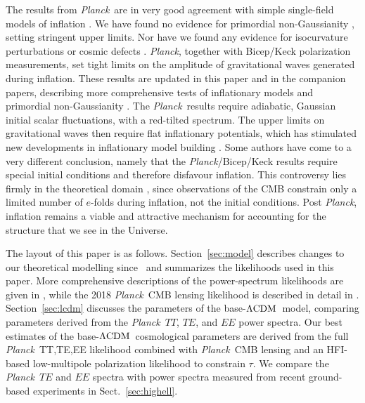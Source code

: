 \documentclass[longauth,traditabstract]{aa}
\def\Planck{\textit{Planck}}
\providecommand{\LCDM}{{$\rm{\Lambda CDM}$}}
\newcommand{\paramsII}{\citetalias{planck2014-a15}}
\newcommand{\planck}{\Planck}
\begin{document}
The results from \planck\ are in very good agreement with simple
single-field models of inflation \citep{planck2013-p17,
planck2014-a24}. We have found no evidence for primordial
non-Gaussianity \citep{planck2013-p09a,planck2014-a19}, setting
stringent upper limits. Nor have we found any evidence for
isocurvature perturbations or cosmic defects \citep[see \paramsII\
and][]{planck2014-a24}. \Planck, together with
Bicep/Keck \citep{pb2015} polarization measurements, set tight limits
on the amplitude of gravitational waves generated during
inflation. These results are updated in this paper and in the
companion papers, describing more comprehensive tests of inflationary
models \citep{planck2016-l10} and primordial non-Gaussianity
\citep{planck2016-l09}. The \planck\ results require adiabatic, Gaussian
initial scalar fluctuations, with a red-tilted spectrum. The upper
limits on gravitational waves then require flat inflationary potentials,
which has stimulated new developments in inflationary model building
\citep[see e.g.,][and references therein]{Ferrara:2013, Kallosh:2013,
Galante:2015, Akrami:2018}. Some authors \citep{Ijjas:2013, Ijjas:2016}
have come to a very different conclusion, namely that the
\Planck/Bicep/Keck results require special initial conditions and therefore
 disfavour inflation.
This controversy lies firmly in the theoretical
domain \citep[see e.g.,][]{Guth:2014,Linde:2017}, since observations of the
CMB constrain only a limited number of $e$-folds during inflation, not the
initial conditions.  Post \Planck, inflation remains a viable and attractive
mechanism for accounting for the structure that we see in the Universe.

The layout of this paper is as follows. Section~\ref{sec:model}
describes changes to our theoretical modelling since \paramsII\ and
summarizes the likelihoods used in this paper. More comprehensive
descriptions of the power-spectrum likelihoods are given
in \citet{planck2016-l05}, while the 2018 \Planck\ CMB lensing
likelihood is described in detail
in \citet{planck2016-l08}. Section~\ref{sec:lcdm} discusses the
parameters of the base-\LCDM\ model, comparing parameters derived from
the \Planck\ $TT$, $TE$, and $EE$ power spectra. Our best estimates of the
 base-\LCDM\ cosmological parameters are derived from the full \Planck\
TT,TE,EE likelihood combined with \Planck\ CMB lensing and an HFI-based
low-multipole polarization likelihood to constrain $\tau$.  We compare
the \Planck\ $TE$ and $EE$ spectra with power spectra measured from recent
ground-based experiments in Sect.~\ref{sec:highell}.
\end{document}
